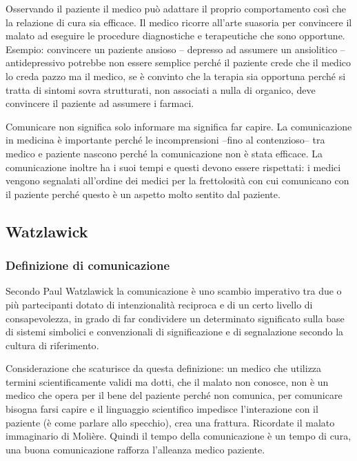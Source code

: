 Osservando il paziente il medico può adattare il proprio comportamento
così che la relazione di cura sia efficace. Il medico ricorre all'arte
suasoria per convincere il malato ad eseguire le procedure diagnostiche
e terapeutiche che sono opportune. Esempio: convincere un paziente
ansioso -- depresso ad assumere un ansiolitico -- antidepressivo
potrebbe non essere semplice perché il paziente crede che il medico lo
creda pazzo ma il medico, se è convinto che la terapia sia opportuna
perché si tratta di sintomi sovra strutturati, non associati a nulla di
organico, deve convincere il paziente ad assumere i farmaci.

Comunicare non significa solo informare ma significa far capire. La
comunicazione in medicina è importante perché le incomprensioni --fino
al contenzioso­­-- tra medico e paziente nascono perché la comunicazione
non è stata efficace. La comunicazione inoltre ha i suoi tempi e questi
devono essere rispettati: i medici vengono segnalati all'ordine dei
medici per la frettolosità con cui comunicano con il paziente perché
questo è un aspetto molto sentito dal paziente.

\subsection{Watzlawick}

\subsubsection{Definizione di comunicazione}

Secondo Paul Watzlawick la comunicazione è uno scambio imperativo tra
due o più partecipanti dotato di intenzionalità reciproca e di un certo
livello di consapevolezza, in grado di far condividere un determinato
significato sulla base di sistemi simbolici e convenzionali di
significazione e di segnalazione secondo la cultura di
riferimento\emph{.}

Considerazione che scaturisce da questa definizione: un medico che
utilizza termini scientificamente validi ma dotti, che il malato non
conosce, non è un medico che opera per il bene del paziente perché non
comunica, per comunicare bisogna farsi capire e il linguaggio
scientifico impedisce l'interazione con il paziente (è come parlare allo
specchio), crea una frattura. Ricordate il malato immaginario di
Molière. Quindi il tempo della comunicazione è un tempo di cura, una
buona comunicazione rafforza l'alleanza medico paziente.

